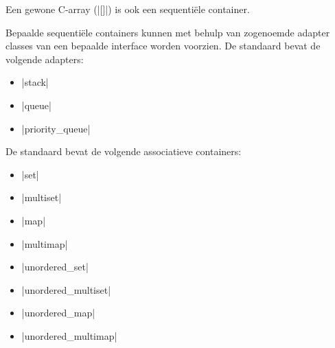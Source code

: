 \begin{cpplstShortInline}
Een gewone C\hyp{}array (|[]|) is ook een sequentiële container.

Bepaalde sequentiële containers kunnen met behulp van zogenoemde adapter classes van een bepaalde interface worden voorzien.
De standaard \Cpp{}  bevat de volgende adapters:
\begin{itemize}
	\item |stack|
	\item |queue|
	\item |priority_queue|
\end{itemize}

De standaard \Cpp{}  bevat de volgende associatieve containers:
\begin{itemize}
	\item |set|
	\item |multiset|
	\item |map|
	\item |multimap| 
	\item |unordered_set|
	\item |unordered_multiset|
	\item |unordered_map|
	\item |unordered_multimap|
\end{itemize}



\end{cpplstShortInline}
